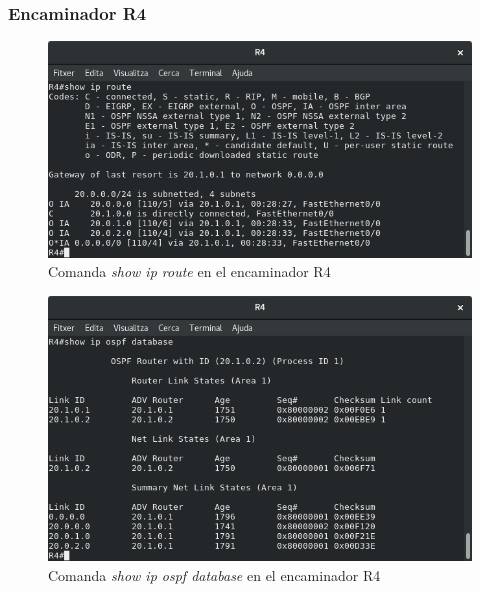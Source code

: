 \documentclass[10pt]{article}
\begin{document}
\subsubsection{Encaminador R4}
\begin{figure}[H]
\begin{center}
\includegraphics[scale=0.5]{Images/ospf-R4-route.png}
\caption{Comanda \textit{show ip route} en el encaminador R4}
\end{center}
\end{figure}
\begin{figure}[H]
\begin{center}
\includegraphics[scale=0.5]{Images/ospf-R4-database.png}
\caption{Comanda \textit{show ip ospf database} en el encaminador R4}
\end{center}
\end{figure}
\end{document}
